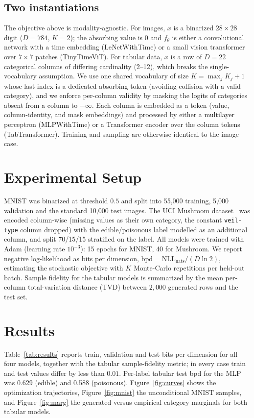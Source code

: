 \documentclass[conference]{IEEEtran}
\begin{document}
\subsection{Two instantiations}
The objective above is modality-agnostic. For images, $x$ is a binarized
$28\times28$ digit ($D{=}784$, $K{=}2$); the absorbing value is $0$ and
$f_\theta$ is either a convolutional network with a time embedding
(LeNetWithTime) or a small vision transformer over $7\times7$ patches
(TinyTimeViT). For tabular data, $x$ is a row of $D{=}22$ categorical columns of
differing cardinality (2--12), which breaks the single-vocabulary assumption.
We use one shared vocabulary of size $K{=}\max_j K_j+1$ whose last index is a
dedicated absorbing token (avoiding collision with a valid category), and we
enforce per-column validity by masking the logits of categories absent from a
column to $-\infty$. Each column is embedded as a token (value,
column-identity, and mask embeddings) and processed by either a multilayer
perceptron (MLPWithTime) or a Transformer encoder over the column tokens
(TabTransformer). Training and sampling are otherwise identical to the image
case.

\section{Experimental Setup}
MNIST was binarized at threshold $0.5$ and split into 55{,}000 training,
5{,}000 validation and the standard 10{,}000 test images. The UCI Mushroom
dataset~\cite{mushroom} was encoded
column-wise (missing values as their own category, the constant \texttt{veil-
type} column dropped) with the edible/poisonous label modelled as an additional
column, and split 70/15/15 stratified on the label. All models were trained
with Adam (learning rate $10^{-3}$): 15 epochs for MNIST, 40 for Mushroom.
We report negative log-likelihood as bits per dimension,
$\mathrm{bpd}=\mathrm{NLL}_{\text{nats}}/(D\ln 2)$, estimating the stochastic
objective with $K$ Monte-Carlo repetitions per held-out batch. Sample fidelity
for the tabular models is summarized by the mean per-column total-variation
distance (TVD) between $2{,}000$ generated rows and the test set.

\section{Results}
Table~\ref{tab:results} reports train, validation and test bits per dimension
for all four models, together with the tabular sample-fidelity metric; in every
case train and test values differ by less than $0.01$. Per-label tabular test
bpd for the MLP was 0.629 (edible) and 0.588 (poisonous). Figure~\ref{fig:curves}
shows the optimization trajectories, Figure~\ref{fig:mnist} the unconditional
MNIST samples, and Figure~\ref{fig:marg} the generated versus empirical category
marginals for both tabular models.
\end{document}
